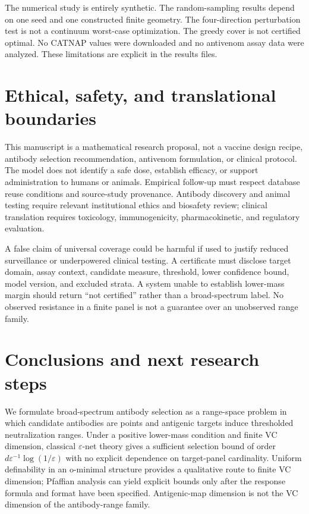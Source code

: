 \documentclass[11pt,a4paper]{article}
\newcommand{\eps}{\varepsilon}
\begin{document}
The numerical study is entirely synthetic. The random-sampling results depend on one seed and one constructed finite geometry. The four-direction perturbation test is not a continuum worst-case optimization. The greedy cover is not certified optimal. No CATNAP values were downloaded and no antivenom assay data were analyzed. These limitations are explicit in the results files.

\section{Ethical, safety, and translational boundaries}
This manuscript is a mathematical research proposal, not a vaccine design recipe, antibody selection recommendation, antivenom formulation, or clinical protocol. The model does not identify a safe dose, establish efficacy, or support administration to humans or animals. Empirical follow-up must respect database reuse conditions and source-study provenance. Antibody discovery and animal testing require relevant institutional ethics and biosafety review; clinical translation requires toxicology, immunogenicity, pharmacokinetic, and regulatory evaluation.

A false claim of universal coverage could be harmful if used to justify reduced surveillance or underpowered clinical testing. A certificate must disclose target domain, assay context, candidate measure, threshold, lower confidence bound, model version, and excluded strata. A system unable to establish lower-mass margin should return “not certified” rather than a broad-spectrum label. No observed resistance in a finite panel is not a guarantee over an unobserved range family.

\section{Conclusions and next research steps}
We formulate broad-spectrum antibody selection as a range-space problem in which candidate antibodies are points and antigenic targets induce thresholded neutralization ranges. Under a positive lower-mass condition and finite VC dimension, classical $\eps$-net theory gives a sufficient selection bound of order $d\eps^{-1}\log(1/\eps)$ with no explicit dependence on target-panel cardinality. Uniform definability in an o-minimal structure provides a qualitative route to finite VC dimension; Pfaffian analysis can yield explicit bounds only after the response formula and format have been specified. Antigenic-map dimension is not the VC dimension of the antibody-range family.
\end{document}
